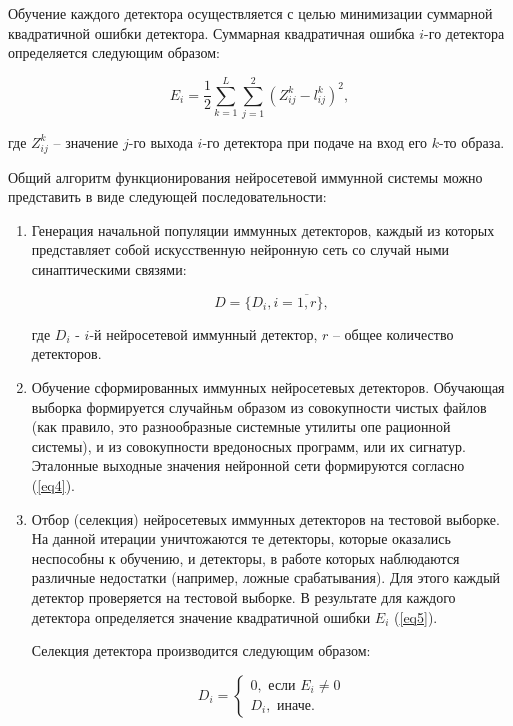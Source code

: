 \documentclass[bachelor, och, referat]{template}
\begin{document}
Обучение каждого детектора осуществляется с целью минимизации
суммарной квадратичной ошибки детектора. Суммарная квадратичная
ошибка $i$-го детектора определяется следующим образом:

\begin{equation}
    E_i = \frac{1}{2}  \sum_{k = 1}^{L} \sum_{j = 1}^{2} (Z_{ij}^k - l_{ij}^k)^2,
    \label{eq5}
\end{equation}

где $Z_{ij}^k$ -- значение $j$-го выхода $i$-го детектора при подаче на вход его $k$-то
образа.

Общий алгоритм функционирования нейросетевой иммунной системы можно представить в виде следующей последовательности:

\begin{enumerate}
    \item Генерация начальной популяции иммунных детекторов, каждый из
    которых представляет собой искусственную нейронную сеть со случай­
    ными синаптическими связями:

    \begin{equation}
        D = \{D_i, i = \overline{1, r}\},
    \end{equation}

    где $D_i$ - $i$-й нейросетевой иммунный детектор, $r$ -- общее количество детекторов.
    \item Обучение сформированных иммунных нейросетевых детекторов.
    Обучающая выборка формируется случайньм образом из совокупности
    чистых файлов (как правило, это разнообразные системные утилиты опе­
    рационной системы), и из совокупности вредоносных программ, или их
    сигнатур. Эталонные выходные значения нейронной сети формируются
    согласно (\ref{eq4}).
    \item Отбор (селекция) нейросетевых иммунных детекторов на тестовой
    выборке. На данной итерации уничтожаются те детекторы, которые 
    ока­зались неспособны к обучению, и детекторы, в работе которых наблюда­ются 
    различные недостатки (например, ложные срабатывания). Для этого
    каждый детектор проверяется на тестовой выборке. В результате для каж­дого 
    детектора определяется значение квадратичной ошибки $E_i$ (\ref{eq5}).

    Селекция детектора производится следующим образом:

    \begin{equation}
        D_i = 
        \begin{cases}
            0, \text{ если } E_i \neq 0 \\
            D_i, \text{ иначе.}
        \end{cases}
        \label{eq7}
    \end{equation}


\end{enumerate}
\end{document}
